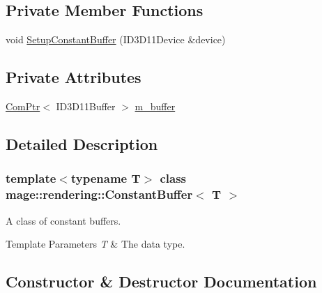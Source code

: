 \subsection*{Private Member Functions}
\begin{DoxyCompactItemize}
\item 
void \mbox{\hyperlink{classmage_1_1rendering_1_1_constant_buffer_ae957fe951307c4628aecc0f3e196fc81}{Setup\+Constant\+Buffer}} (I\+D3\+D11\+Device \&device)
\end{DoxyCompactItemize}
\subsection*{Private Attributes}
\begin{DoxyCompactItemize}
\item 
\mbox{\hyperlink{namespacemage_ae74f374780900893caa5555d1031fd79}{Com\+Ptr}}$<$ I\+D3\+D11\+Buffer $>$ \mbox{\hyperlink{classmage_1_1rendering_1_1_constant_buffer_a1bf487e7e5d8dfee471cc7b3514f6313}{m\+\_\+buffer}}
\end{DoxyCompactItemize}


\subsection{Detailed Description}
\subsubsection*{template$<$typename T$>$\newline
class mage\+::rendering\+::\+Constant\+Buffer$<$ T $>$}

A class of constant buffers.


\begin{DoxyTemplParams}{Template Parameters}
{\em T} & The data type. \\
\hline
\end{DoxyTemplParams}


\subsection{Constructor \& Destructor Documentation}
\mbox{\label{classmage_1_1rendering_1_1_constant_buffer_af282b97fba72826646c1bc31d8953b9e}} 

